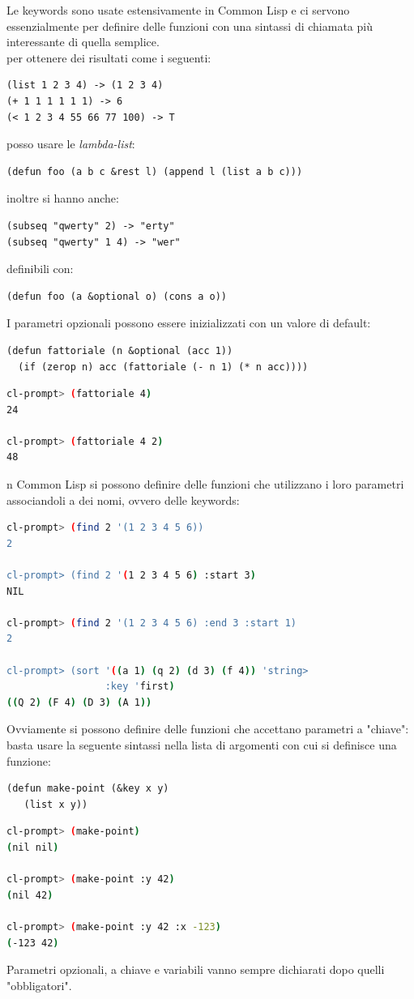 \documentclass[a4paper,12pt, oneside]{book}
\begin{document}
Le keywords sono usate estensivamente in Common Lisp e ci
servono essenzialmente per definire delle funzioni con una
sintassi di chiamata più interessante di quella semplice.\\
per ottenere dei risultati come i seguenti:
\begin{verbatim}
(list 1 2 3 4) -> (1 2 3 4)
(+ 1 1 1 1 1 1) -> 6
(< 1 2 3 4 55 66 77 100) -> T
\end{verbatim}
posso usare le \textit{lambda-list}:
\begin{verbatim}
(defun foo (a b c &rest l) (append l (list a b c)))
\end{verbatim}
inoltre si hanno anche:
\begin{verbatim}
(subseq "qwerty" 2) -> "erty"
(subseq "qwerty" 1 4) -> "wer"
\end{verbatim}
definibili con:
\begin{verbatim}
(defun foo (a &optional o) (cons a o))
\end{verbatim}
I parametri opzionali possono essere inizializzati con un valore di default:
\begin{verbatim}
(defun fattoriale (n &optional (acc 1))
  (if (zerop n) acc (fattoriale (- n 1) (* n acc))))
\end{verbatim}
\begin{shaded}
\begin{lstlisting}[language=bash]
cl-prompt> (fattoriale 4)
24

cl-prompt> (fattoriale 4 2)
48
\end{lstlisting}
\end{shaded}
n Common Lisp si possono definire delle funzioni che utilizzano i loro parametri
associandoli a dei nomi, ovvero delle keywords:
\begin{shaded}
\begin{lstlisting}[language=bash]
cl-prompt> (find 2 '(1 2 3 4 5 6))
2

cl-prompt> (find 2 '(1 2 3 4 5 6) :start 3)
NIL

cl-prompt> (find 2 '(1 2 3 4 5 6) :end 3 :start 1)
2

cl-prompt> (sort '((a 1) (q 2) (d 3) (f 4)) 'string>
                 :key 'first)
((Q 2) (F 4) (D 3) (A 1))
\end{lstlisting}
\end{shaded}
Ovviamente si possono definire delle funzioni che accettano parametri a "chiave": basta usare la seguente
sintassi nella lista di argomenti con cui si definisce una funzione:
\begin{verbatim}
(defun make-point (&key x y)
   (list x y))
\end{verbatim}
\begin{shaded}
\begin{lstlisting}[language=bash]
cl-prompt> (make-point)
(nil nil)

cl-prompt> (make-point :y 42)
(nil 42)

cl-prompt> (make-point :y 42 :x -123)
(-123 42)
\end{lstlisting}
\end{shaded}
Parametri opzionali, a chiave e variabili vanno sempre dichiarati dopo quelli "obbligatori".\\
\end{document}
